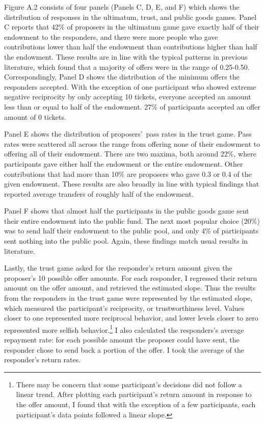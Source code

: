 \documentclass[12pt]{article}
\begin{document}
Figure A.2 consists of four panels (Panels C, D, E, and F) which shows the distribution of responses in the ultimatum, trust, and public goods games. Panel C reports that 42\% of proposers in the ultimatum game gave exactly half of their endowment to the responders, and there were more people who gave contributions lower than half the endowment than contributions higher than half the endowment. These results are in line with the typical patterns in previous literature, which found that a majority of offers were in the range of 0.25-0.50. Correspondingly, Panel D shows the distribution of the minimum offers the responders accepted. With the exception of one participant who showed extreme negative reciprocity by only accepting 10 tickets, everyone accepted an amount less than or equal to half of the endowment. 27\% of participants accepted an offer amount of 0 tickets. 

Panel E shows the distribution of proposers\rq \ pass rates in the trust game. Pass rates were scattered all across the range from offering none of their endowment to offering all of their endowment. There are two maxima, both around 22\%, where participants gave either half the endowment or the entire endowment. Other contributions that had more than 10\% are proposers who gave 0.3 or 0.4 of the given endowment. These results are also broadly in line with typical findings that reported average transfers of roughly half of the endowment.

Panel F shows that almost half the participants in the public goods game sent their entire endowment into the public fund. The next most popular choice (20\%) was to send half their endowment to the public pool, and only 4\% of participants sent nothing into the public pool. Again, these findings match usual results in literature.

Lastly, the trust game asked for the responder\rq s return amount given the proposer\rq s 10 possible offer amounts. For each responder, I regressed their return amount on the offer amount, and retrieved the estimated slope. Thus the results from the responders in the trust game were represented by the estimated slope, which measured the participant\rq s reciprocity, or trustworthiness level. Values closer to one represented more reciprocal behavior, and lower levels closer to zero represented more selfish behavior.\footnote{There may be concern that some participant\rq s decisions did not follow a linear trend. After plotting each participant\rq s return amount in response to the offer amount, I found that with the exception of a few participants, each participant\rq s data points followed a linear slope.} I also calculated the responders\rq s average repayment rate: for each possible amount the proposer could have sent, the responder chose to send back a portion of the offer. I took the average of the responder\rq s return rates.
\end{document}
